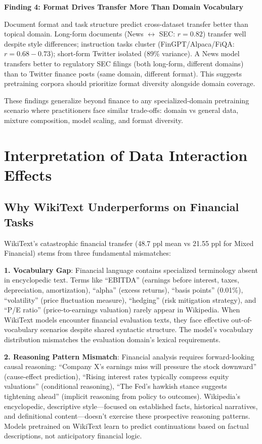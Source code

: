 \textbf{Finding 4: Format Drives Transfer More Than Domain Vocabulary}

Document format and task structure predict cross-dataset transfer better than topical domain. Long-form documents (News $\leftrightarrow$ SEC: $r = 0.82$) transfer well despite style differences; instruction tasks cluster (FinGPT/Alpaca/FiQA: $r = 0.68-0.73$); short-form Twitter isolated (89\% variance). A News model transfers better to regulatory SEC filings (both long-form, different domains) than to Twitter finance posts (same domain, different format). This suggests pretraining corpora should prioritize format diversity alongside domain coverage.

These findings generalize beyond finance to any specialized-domain pretraining scenario where practitioners face similar trade-offs: domain vs general data, mixture composition, model scaling, and format diversity.

\section{Interpretation of Data Interaction Effects}

\subsection{Why WikiText Underperforms on Financial Tasks}

WikiText's catastrophic financial transfer (48.7 ppl mean vs 21.55 ppl for Mixed Financial) stems from three fundamental mismatches:

\textbf{1. Vocabulary Gap}: Financial language contains specialized terminology absent in encyclopedic text. Terms like ``EBITDA'' (earnings before interest, taxes, depreciation, amortization), ``alpha'' (excess returns), ``basis points'' (0.01\%), ``volatility'' (price fluctuation measure), ``hedging'' (risk mitigation strategy), and ``P/E ratio'' (price-to-earnings valuation) rarely appear in Wikipedia. When WikiText models encounter financial evaluation texts, they face effective out-of-vocabulary scenarios despite shared syntactic structure. The model's vocabulary distribution mismatches the evaluation domain's lexical requirements.

\textbf{2. Reasoning Pattern Mismatch}: Financial analysis requires forward-looking causal reasoning: ``Company X's earnings miss will pressure the stock downward'' (cause-effect prediction), ``Rising interest rates typically compress equity valuations'' (conditional reasoning), ``The Fed's hawkish stance suggests tightening ahead'' (implicit reasoning from policy to outcomes). Wikipedia's encyclopedic, descriptive style—focused on established facts, historical narratives, and definitional content—doesn't exercise these prospective reasoning patterns. Models pretrained on WikiText learn to predict continuations based on factual descriptions, not anticipatory financial logic.

